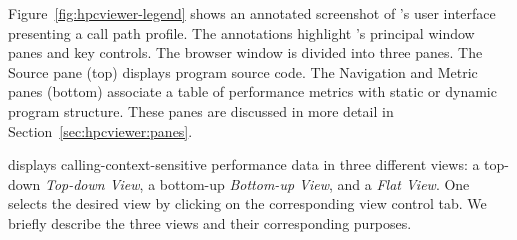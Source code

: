 Figure~\ref{fig:hpcviewer-legend} shows an annotated screenshot of \hpcviewer{}'s user interface presenting a call path profile.
The annotations highlight \hpcviewer{}'s principal window panes and key controls.
The browser window is divided into three panes.
The Source pane (top) displays program source code.
The Navigation and Metric panes (bottom) associate a table of performance metrics with static or dynamic program structure.
These panes are discussed in more detail in Section~\ref{sec:hpcviewer:panes}.

\hpcviewer{} displays calling-context-sensitive performance data in three different views: a top-down \emph{Top-down View}, a bottom-up \emph{Bottom-up View}, and a \emph{Flat View}.
One selects the desired view by clicking on the corresponding view control tab.
We briefly describe the three views and their corresponding purposes.


